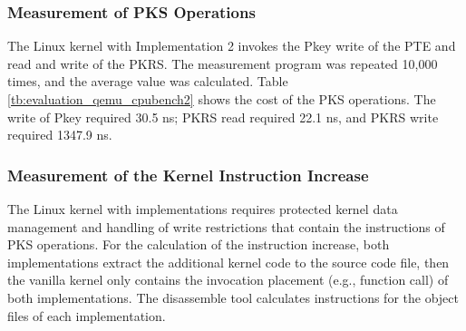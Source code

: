
\subsubsection{Measurement of PKS Operations}

The Linux kernel with Implementation 2 invokes the Pkey write of the PTE and
read and write of the PKRS. The measurement program was repeated 10,000 times, and
the average value was calculated.
Table \ref{tb:evaluation_qemu_cpubench2} shows the cost of the PKS operations.
The write of Pkey required 30.5 ns; PKRS read required 22.1 ns, and PKRS
write required 1347.9 ns.

%

\subsubsection{Measurement of the Kernel Instruction Increase}
The Linux kernel with implementations requires protected kernel data management
and handling of write restrictions that contain the instructions of PKS
operations.
%
%
For the calculation of the instruction increase, both implementations extract
the additional kernel code to the source code file, then the vanilla kernel only
contains the invocation placement (e.g., function call) of both implementations.
The disassemble tool calculates instructions for the object files of each
implementation.

